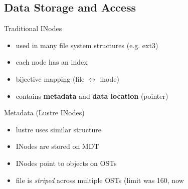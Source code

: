 \subsection{Data Storage and Access}

\begin{frame}{Traditional INodes}
    \begin{itemize}
        \item used in many file system structures (e.g. ext3)
        \item each node has an index
        \item bijective mapping (file $\leftrightarrow$ inode)
        \item contains \textbf{metadata} and \textbf{data location} (pointer)
    \end{itemize}
\end{frame}

\begin{frame}{Metadata (Lustre INodes)}
    \begin{itemize}
        \item lustre uses similar structure
        \item INodes are stored on MDT
        \item INodes point to objects on OSTs
        \item file is \emph{striped} across multiple OSTs (limit was 160, now
    \end{itemize}
\end{frame}

